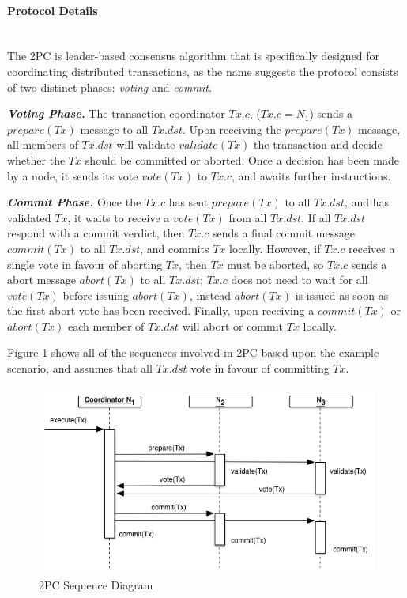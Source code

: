 	       \paragraph{Protocol Details} \hspace{0pt} \\
	       The 2PC is leader-based consensus algorithm that is specifically designed for coordinating distributed transactions, as the name suggests the protocol consists of two distinct phases: \emph{voting} and \emph{commit}. 
	       
	       \textbf{\emph{Voting Phase.}} The transaction coordinator $Tx.c$, ($Tx.c = N_1$) sends a $prepare(Tx)$ message to all $Tx.dst$.  Upon receiving the $prepare(Tx)$ message, all members of $Tx.dst$ will validate $validate(Tx)$ the transaction and decide whether the $Tx$ should be committed or aborted.  Once a decision has been made by a node, it sends its vote $vote(Tx)$ to $Tx.c$, and awaits further instructions.  
	       
	       \textbf{\emph{Commit Phase.}}  Once the $Tx.c$ has sent $prepare(Tx)$ to all $Tx.dst$, and has validated $Tx$, it waits to receive a $vote(Tx)$ from all $Tx.dst$.  If all $Tx.dst$ respond with a commit verdict, then $Tx.c$ sends a final commit message $commit(Tx)$ to all $Tx.dst$, and commits $Tx$ locally.  However, if $Tx.c$ receives a single vote in favour of aborting $Tx$, then $Tx$ must be aborted, so $Tx.c$ sends a abort message $abort(Tx)$ to all $Tx.dst$; $Tx.c$ does not need to wait for all $vote(Tx)$ before issuing $abort(Tx)$, instead $abort(Tx)$ is issued as soon as the first abort vote has been received.  Finally, upon receiving a $commit(Tx)$ or $abort(Tx)$ each member of $Tx.dst$ will abort or commit $Tx$ locally.  
	       
	       Figure \ref{fig:2PC} shows all of the sequences involved in 2PC based upon the example scenario, and assumes that all $Tx.dst$ vote in favour of committing $Tx$.  
	       	       
            \begin{figure}[htbp!] 
                \centering    
                \includegraphics[width=1.0\textwidth]{2PC}
                \caption[Two-phase Commit Protocol]{2PC Sequence Diagram}
                \label{fig:2PC}
            \end{figure}
            

